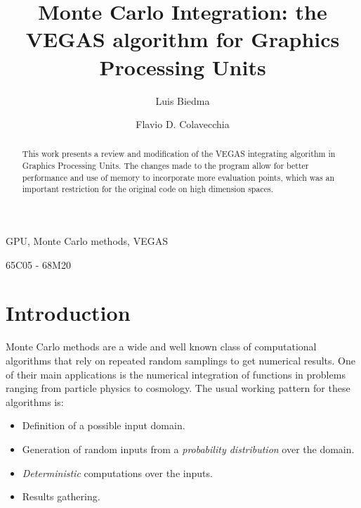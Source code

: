 \documentclass[english]{maciarticle}
\begin{document}
\title{Monte Carlo Integration: the VEGAS algorithm for Graphics Processing Units}

\author[$a$]{Luis Biedma}
\author[$b$]{Flavio D. Colavecchia}
%


 \maketitle


\begin{abstract}
This work presents a review and modification of the VEGAS integrating algorithm in Graphics Processing Units. The changes made to the program allow for better performance and use of memory to incorporate more evaluation points, which was an important restriction for the original code on high dimension spaces.
\end{abstract}

\begin{keywords}
GPU, Monte Carlo methods, VEGAS
\end{keywords}

\begin{mathsubclass}
65C05 - 68M20
\end{mathsubclass}


{\thispagestyle{empty}} %



\section{Introduction}

Monte Carlo methods are a wide and well known class of computational algorithms that rely on repeated random samplings to get numerical results. One of their main applications is the numerical integration of functions in problems ranging from particle physics\cite{lhc} to cosmology\cite{cosmo}. The usual working pattern for these algorithms is:

\begin{itemize}
	\item Definition of a possible input domain.
	\item Generation of random inputs from a \textit{probability distribution} over the domain.
	\item \textit{Deterministic} computations over the inputs.
	\item Results gathering.
\end{itemize}
\end{document}
